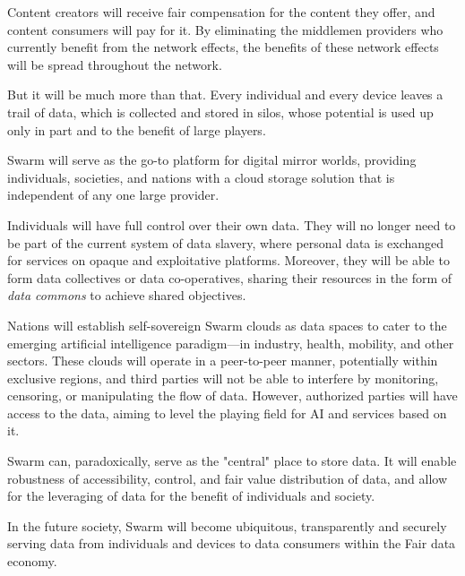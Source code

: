 Content creators will receive fair compensation for the content they offer, and content consumers will pay for it. By eliminating the middlemen providers who currently benefit from the network effects, the benefits of these network effects will be spread throughout the network.

But it will be much more than that. Every individual and every device leaves a trail of data, which is collected and stored in silos, whose potential is used up only in part and to the benefit of large players.

Swarm will serve as the go-to platform for digital mirror worlds, providing individuals, societies, and nations with a cloud storage solution that is independent of any one large provider. 


Individuals will have full control over their own data. They will no longer need to be part of the current system of data slavery, where personal data is exchanged for services on opaque and exploitative platforms. Moreover, they will be able to form data collectives or data co-operatives, sharing their resources in the form of \emph{data commons} to achieve shared objectives. 

Nations will establish self-sovereign Swarm clouds as data spaces to cater to the emerging artificial intelligence paradigm—in industry, health, mobility, and other sectors. These clouds will operate in a peer-to-peer manner, potentially within exclusive regions, and third parties will not be able to interfere by monitoring, censoring, or manipulating the flow of data. However, authorized parties will have access to the data, aiming to level the playing field for AI and services based on it.  

Swarm can, paradoxically, serve as the "central" place to store data. It will enable robustness of accessibility, control, and fair value distribution of data, and allow for the leveraging of data for the benefit of individuals and society.

In the future society, Swarm will become ubiquitous, transparently and securely serving data from individuals and devices to data consumers within the Fair data economy.

